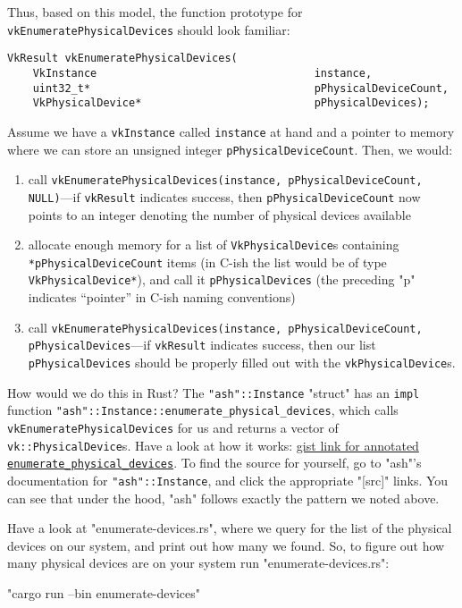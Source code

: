 \documentclass[12pt,letterpaper]{article}
\newcommand{\inquotes}[1]{``#1''}	%
\newcommand{\ril}[1]{\texttt{#1}}
\newcommand{\cil}[1]{\texttt{#1}}
\begin{document}
	Thus, based on this model, the function prototype for \cil{vkEnumeratePhysicalDevices} should look familiar:
	\begin{verbatim}
VkResult vkEnumeratePhysicalDevices(
	VkInstance                                  instance,
	uint32_t*                                   pPhysicalDeviceCount,
	VkPhysicalDevice*                           pPhysicalDevices);
	\end{verbatim}
	Assume we have a \cil{vkInstance} called \cil{instance} at hand and a pointer to memory where we can store an unsigned integer \cil{pPhysicalDeviceCount}. Then, we would:
		\begin{enumerate}
			\item call \cil{vkEnumeratePhysicalDevices(instance, pPhysicalDeviceCount, NULL)}---if \cil{vkResult} indicates success, then \cil{pPhysicalDeviceCount} now points to an integer denoting the number of physical devices available
			
			\item allocate enough memory for a list of \cil{VkPhysicalDevice}s containing \cil{*pPhysicalDeviceCount} items (in C-ish the list would be of type \cil{VkPhysicalDevice*}), and call it \cil{pPhysicalDevices} (the preceding "p" indicates \inquotes{pointer} in C-ish naming conventions)
			
			\item call \cil{vkEnumeratePhysicalDevices(instance, pPhysicalDeviceCount, pPhysicalDevices}---if \cil{vkResult} indicates success, then our list \cil{pPhysicalDevices} should be properly filled out with the \cil{vkPhysicalDevice}s.
		\end{enumerate}
	
	How would we do this in Rust? The \ril{"ash"::Instance} "struct" has an \ril{impl} function \ril{"ash"::Instance::enumerate_physical_devices}, which calls \cil{vkEnumeratePhysicalDevices} for us and returns a vector of \ril{vk::PhysicalDevice}s. Have a look at how it works: \href{https://gist.github.com/bzm3r/175cd2b63db8f783ed968df20462be67}{gist link for annotated \ril{enumerate_physical_devices}}. To find the source for yourself, go to "ash"'s documentation for \ril{"ash"::Instance}, and click the appropriate "[src]" links. You can see that under the hood, "ash" follows exactly the pattern we noted above. 
	
	Have a look at "enumerate-devices.rs", where we query for the list of the physical devices on our system, and print out how many we found. So, to figure out how many physical devices are on your system run "enumerate-devices.rs": 
		\begin{center}
			"cargo run --bin enumerate-devices"
		\end{center}
	
\end{document}
